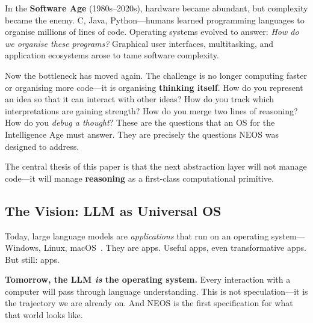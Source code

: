 In the \textbf{Software Age} (1980s--2020s), hardware became abundant,
but complexity became the enemy.  C, Java, Python---humans learned
programming languages to organise millions of lines of code.  Operating
systems evolved to answer: \emph{How do we organise these programs?}
Graphical user interfaces, multitasking, and application ecosystems
arose to tame software complexity.

Now the bottleneck has moved again.  The challenge is no longer
computing faster or organising more code---it is organising
\textbf{thinking itself}.  How do you represent an idea so that it can
interact with other ideas?  How do you track which interpretations are
gaining strength?  How do you merge two lines of reasoning?  How do you
\emph{debug a thought}?  These are the questions that an OS for the
Intelligence Age must answer.  They are precisely the questions NEOS was
designed to address.

\begin{calloutbox}
The central thesis of this paper is that the next abstraction layer
will not manage code---it will manage \textbf{reasoning} as a
first-class computational primitive.
\end{calloutbox}

\subsection{The Vision: LLM as Universal OS}\label{sec:vision}

Today, large language models are \emph{applications} that run on an
operating system---Windows, Linux, macOS~\cite{brown2020language}.
They are apps.  Useful apps, even transformative apps.  But still:
apps.

\textbf{Tomorrow, the LLM \emph{is} the operating system.}  Every
interaction with a computer will pass through language understanding.
This is not speculation---it is the trajectory we are already on.  And
NEOS is the first specification for what that world looks like.

